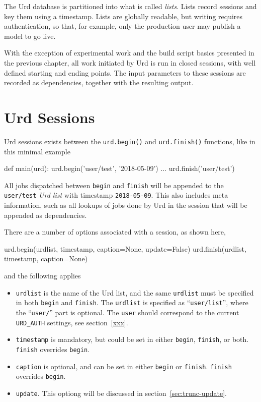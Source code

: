 The Urd database is partitioned into what is called \textsl{lists}.
Lists record sessions and key them using a timestamp.  Lists are
globally readable, but writing requires authentication, so that, for
example, only the production user may publish a model to go live.

With the exception of experimental work and the build script basics
presented in the previous chapter, all work initiated by Urd is run in
closed sessions, with well defined starting and ending points.  The
input parameters to these sessions are recorded as dependencies,
together with the resulting output.



\section{Urd Sessions}

Urd sessions exists between the \texttt{urd.begin()}
and \texttt{urd.finish()} functions, like in this minimal example
\begin{python}
def main(urd):
    urd.begin('user/test', '2018-05-09')
    ...
    urd.finish('user/test')
\end{python}
All jobs dispatched between \texttt{begin} and \texttt{finish} will be
appended to the \texttt{user/test} \textsl{Urd list} with
timestamp \texttt{2018-05-09}.  This also includes meta information,
such as all lookups of jobs done by Urd in the session that will be
appended as dependencies.

There are a number of options associated with a session, as shown
here,
\begin{python}
urd.begin(urdlist, timestamp, caption=None, update=False)
urd.finish(urdlist, timestamp, caption=None)
\end{python}
and the following applies
\begin{itemize}
\item [] \texttt{urdlist} is the name of the Urd list, and the same
  \texttt{urdlist} must be specified in both \texttt{begin}
  and \texttt{finish}.  The \texttt{urdlist} is specified as
  ``\texttt{user/list}'', where the ``\texttt{user/}'' part is
  optional.  The \texttt{user} should correspond to the
  current \texttt{URD\_AUTH} settings, see section~\ref{xxx}.

\item [] \texttt{timestamp} is mandatory, but could be set in either
  \texttt{begin}, \texttt{finish}, or both.  \texttt{finish}
  overrides \texttt{begin}.

\item [] \texttt{caption} is optional, and can be set in either
  \texttt{begin} or \texttt{finish}.  \texttt{finish} overrides
  \texttt{begin}.

\item [] \texttt{update}.  This optiong will be discussed in
section~\ref{sec:trunc-update}.
\end{itemize}

